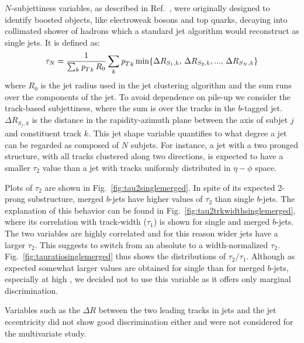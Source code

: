 $N$-subjettiness variables, as described in Ref.~\cite{nsubjettiness}, were originally designed to identify boosted objects, like electroweak bosons and top quarks, decaying into collimated shower of hadrons which a standard jet algorithm would reconstruct as single jets. It is defined as:
\begin{equation*} 
\tau_N = \frac{1}{\sum_k {{\emph{p}_{T}}}_k\,R_0} \sum_k {{\emph{p}_{T}}}_k \min \{ \Delta R_{S_1,k},\,\Delta R_{S_2,k},...,\,\Delta R_{S_N,k} \}
\end{equation*} 
where $R_0$ is the jet radius used in the jet clustering algorithm and the sum runs over the components of the jet. To avoid dependence on pile-up we consider the track-based subjettiness, where the sum 
 is over the tracks in the $b$-tagged jet. $\Delta R_{S_j,k} $ is the distance in the rapidity-azimuth plane between the axis of subjet $j$ and constituent track $k$. This jet shape variable quantifies to what degree a jet can be regarded as composed of $N$ subjets. For instance, a jet with a two pronged structure, with all tracks clustered along two directions, is expected to have a smaller $\tau_2$ value than a jet with tracks uniformly distributed in $\eta-\phi$ space.

Plots of $ \tau_2$ are shown in Fig.~\ref{fig:tau2singlemerged}. In spite of its expected 2-prong substructure, merged $b$-jets have higher values of $ \tau_2$ than single $b$-jets. The explanation of this behavior can be found in Fig.~\ref{fig:tau2trkwidthsinglemerged}, where its correlation with  track-width ($\tau_1$) is shown for single and merged $b$-jets. The two variables are highly correlated and for this reason wider jets  have a larger $ \tau_2$. This suggests to switch from an absolute to a width-normalized
$\tau_2$. Fig.~\ref{fig:tauratiosinglemerged} thus shows the distributions of $\tau_2/\tau_1$. Although as expected somewhat larger values are obtained for single than for merged $b$-jets, especially at high \pt, we decided not to use this variable as it offers only marginal discrimination. 

Variables such as the $\Delta R$ between the two leading tracks in jets and the jet eccentricity did not show good discrimination either and were not considered for the multivariate study.

